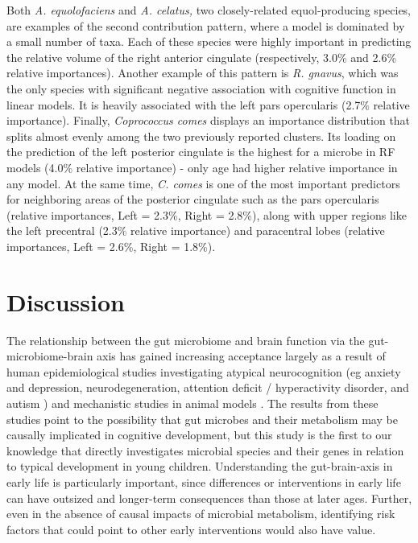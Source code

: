 \documentclass{article}
\begin{document}
Both \emph{A. equolofaciens} and \emph{A. celatus,} two closely-related
equol-producing species, are examples of the second contribution
pattern, where a model is dominated by a small number of taxa.
Each of these species were highly important in predicting the relative volume of
the right anterior cingulate (respectively, 3.0\% and 2.6\% relative
importances). Another example of this pattern is \emph{R. gnavus}, which was the only
species with significant negative association with cognitive function in linear models.
It is heavily associated with the left pars opercularis (2.7\% relative importance). 
Finally, \emph{Coprococcus comes} displays an importance
distribution that splits almost evenly among the two previously reported
clusters. Its loading on the prediction of the left posterior cingulate
is the highest for a microbe in RF models (4.0\% relative importance) -
only age had higher relative importance in any model. At the same time,
\textit{C. comes} is one of the most important predictors for neighboring areas of the
posterior cingulate such as the pars opercularis (relative importances,
Left = 2.3\%, Right = 2.8\%), along with upper regions like the left
precentral (2.3\% relative importance) and paracentral lobes (relative
importances, Left = 2.6\%, Right = 1.8\%).

\section*{Discussion}

The relationship between the gut microbiome and brain function via the
gut-microbiome-brain axis has gained increasing acceptance largely as a
result of human epidemiological studies investigating atypical
neurocognition (eg anxiety and depression, neurodegeneration, attention
deficit / hyperactivity disorder, and autism \cite{romanGutBrainAxis2018,fosterGutBrainAxis2013})
and mechanistic studies in animal models
\cite{hsiaoMicrobiotaModulateBehavioral2013,needhamGutderivedMetaboliteAlters2022}.
The results from these studies point to the possibility
that gut microbes and their metabolism may be causally implicated in
cognitive development, but this study is the first to our knowledge that
directly investigates microbial species and their genes in relation to
typical development in young children. Understanding the gut-brain-axis
in early life is particularly important, since differences or
interventions in early life can have outsized and longer-term
consequences than those at later ages. Further, even in the absence of
causal impacts of microbial metabolism, identifying risk factors that
could point to other early interventions would also have value.
\end{document}
